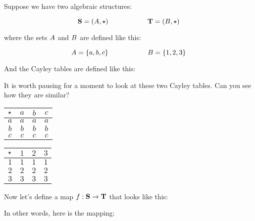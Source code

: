 \documentclass[../../../main.tex]{subfiles}
\begin{document}
\begin{fexample}
\label{ex:algebraic-isomorphism}

Suppose we have two algebraic structures:

\begin{equation*}
  \algebra{S} = (\set{A}, \opSymbol/) \hskip 2cm \algebra{T} = (\set{B}, \opSymbol/)
\end{equation*}

where the sets $A$ and $B$ are defined like this:

\begin{equation*}
  A = \{ a, b, c \} \hskip 2cm B = \{ 1, 2, 3 \}
\end{equation*}

And the Cayley tables are defined like this:

\begin{ponder}
  It is worth pausing for a moment to look at these two Cayley tables. Can you see how they are similar?
\end{ponder}

\begin{center}
  \begin{tabular}{| c || c | c | c | }
    \hline
    $\opSymbol/$ & $a$ & $b$ & $c$ \\ \hline \hline
    $a$          & $a$ & $a$ & $a$ \\ \hline
    $b$          & $b$ & $b$ & $b$ \\ \hline
    $c$          & $c$ & $c$ & $c$ \\ \hline
  \end{tabular}
  \hskip 2cm
  \begin{tabular}{| c || c | c | c | }
    \hline
    $\opSymbol/$ & $1$ & $2$ & $3$ \\ \hline \hline
    $1$          & $1$ & $1$ & $1$ \\ \hline
    $2$          & $2$ & $2$ & $2$ \\ \hline
    $3$          & $3$ & $3$ & $3$ \\ \hline
  \end{tabular}
\end{center}

Now let's define a map $f: \mathbf{S} \rightarrow \mathbf{T}$ that looks like this:

\begin{aside}
  \begin{remark}
    
In other words, here is the mapping:


\end{remark}
\end{aside}
\end{fexample}
\end{document}

